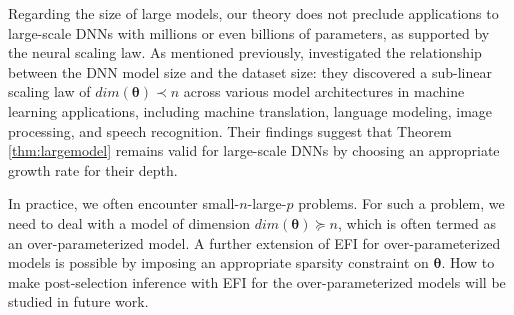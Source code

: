\documentclass[11pt]{article}
\newcommand{\bx}{{\boldsymbol x}}
\newcommand{\btheta}{{\boldsymbol \theta}}
\begin{document}
 
Regarding the size of large models, our theory does not
preclude applications to large-scale DNNs with millions or even billions of parameters, as supported by the neural scaling law.
 As mentioned previously,  \cite{Hestness2017DeepLS}  investigated the relationship between the DNN model size and the dataset size: they discovered
 a sub-linear scaling law of $dim(\btheta) \prec n$ 
  across various model architectures in
  machine learning applications, including machine translation, language modeling, image processing, and speech recognition. Their findings suggest that Theorem \ref{thm:largemodel}
 remains valid for large-scale DNNs
 by choosing an appropriate growth rate for their depth.

  


   
 

 

 
  In practice, we often encounter small-$n$-large-$p$ problems. For such a problem, we need to deal with a model of dimension $dim(\btheta)  \succeq n$, which is often termed as 
  an over-parameterized model.  A further 
  extension of EFI for over-parameterized models is possible by imposing an appropriate sparsity constraint on $\btheta$. 
  How to make post-selection inference with EFI for the over-parameterized models will be studied in future work.  
\end{document}
